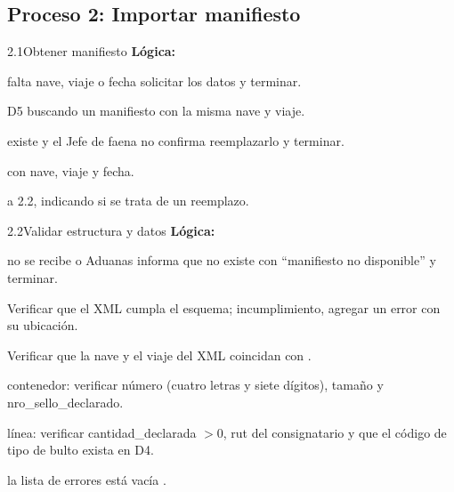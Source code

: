 \subsection{Proceso 2: Importar manifiesto}

\begin{minispec}{2.1}{Obtener manifiesto}
\textbf{Lógica:}
\begin{logica}
    \item {} falta nave, viaje o fecha  solicitar los datos y terminar.
    \item {} D5 buscando un manifiesto con la misma nave y viaje.
    \item {} existe y el Jefe de faena no confirma reemplazarlo 
     y terminar.
    \item {}  con nave, viaje y fecha.
    \item {}  a 2.2, indicando si se trata de un reemplazo.
\end{logica}
\end{minispec}

\begin{minispec}{2.2}{Validar estructura y datos}
\textbf{Lógica:}
\begin{logica}
    \item {} no se recibe  o Aduanas informa que no existe   con ``manifiesto no disponible'' y terminar.
    \item Verificar que el XML cumpla el esquema;  incumplimiento, agregar un
    error con su ubicación.
    \item Verificar que la nave y el viaje del XML coincidan con .
    \item {} contenedor: verificar número (cuatro letras y siete dígitos), tamaño
    y nro\_sello\_declarado.
    \item {} línea: verificar cantidad\_declarada $> 0$, rut del consignatario y
    que el código de tipo de bulto exista en D4.
    \item {} la lista de errores está vacía  
     .
\end{logica}
\end{minispec}


